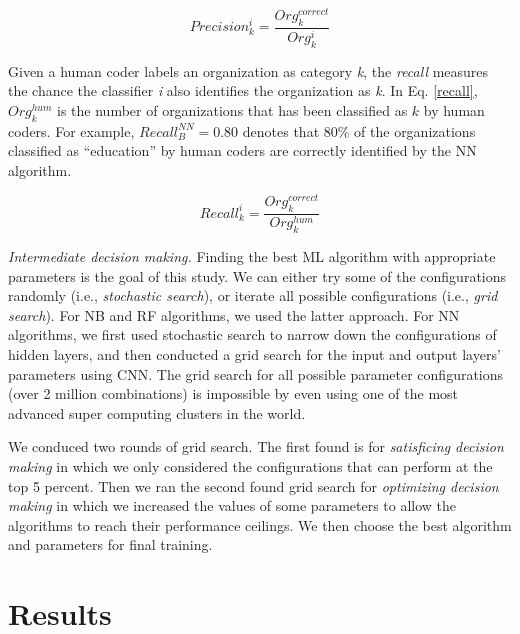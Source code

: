 \documentclass[11pt]{article}
\begin{document}
\begin{equation} \label{precision}
    Precision^{i}_{k}=\frac{Org^{correct}_{k}}{Org^{i}_{k}}
\end{equation}

Given a human coder labels an organization as category \textit{k}, the \textit{recall} measures the chance the classifier \textit{i} also identifies the organization as \textit{k}. In Eq. \ref{recall}, $Org^{hum}_{k}$ is the number of organizations that has been classified as $k$ by human coders. For example, $Recall^{NN}_{B}=0.80$ denotes that 80\% of the organizations classified as ``education'' by human coders are correctly identified by the NN algorithm.

\begin{equation} \label{recall}
    Recall^{i}_{k}=\frac{Org^{correct}_{k}}{Org^{hum}_{k}}
\end{equation}

\textit{Intermediate decision making.} Finding the best ML algorithm with appropriate parameters is the goal of this study. We can either try some of the configurations randomly (i.e., \textit{stochastic search}), or iterate all possible configurations (i.e., \textit{grid search}). For NB and RF algorithms, we used the latter approach. For NN algorithms, we first used stochastic search to narrow down the configurations of hidden layers, and then conducted a grid search for the input and output layers' parameters using CNN. The grid search for all possible parameter configurations (over 2 million combinations) is impossible by even using one of the most advanced super computing clusters in the world.

We conduced two rounds of grid search. The first found is for \textit{satisficing decision making} in which we only considered the configurations that can perform at the top 5 percent. Then we ran the second found grid search for \textit{optimizing decision making} in which we increased the values of some parameters to allow the algorithms to reach their performance ceilings. We then choose the best algorithm and parameters for final training.






\section{Results}



\sloppy
\printbibliography
\end{document}
